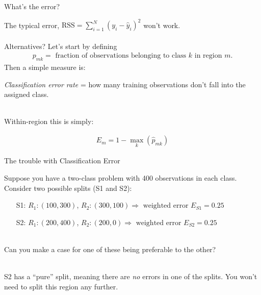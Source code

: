 \documentclass[mathserif, aspectratio=169]{beamer}
\begin{document}
\begin{frame}{What's the error?}

The typical error, $\text{RSS} = \sum_{i=1}^N (y_i-\hat{y}_i)^2$ won't work.  \\~\\

Alternatives?  Let's start by defining 
\begin{align*}
p_{mk} = \text{ fraction of observations belonging to class $k$ in region $m$.}
\end{align*}
Then a simple measure is:

\begin{center}
\textit{Classification error rate} = how many training observations don't fall into the assigned class.   \\~\\
\end{center}

 Within-region this is simply:

\begin{align*}
E_m = 1- \max_k (\hat{p}_{mk})
\end{align*}
\end{frame}

\begin{frame}{The trouble with Classification Error}

Suppose you have a two-class problem with 400 observations in each class.  Consider two possible splits (S1 and S2):
\begin{itemize}
\item[S1:] $R_1: (100,300)$, $R_2: (300,100)\Rightarrow \text{ weighted error } E_{S1} = 0.25$
\item[S2:]  $R_1: (200,400)$, $R_2: (200,0)\Rightarrow \text{ weighted error }E_{S2} = 0.25$\\~\\
\end{itemize}

Can you make a case for one of these being preferable to the other?\\~\\

\pause

S2 has a ``pure'' split, meaning there are \textit{no} errors in one of the splits.  You won't need to split this region any further.  

\end{frame}
\end{document}
